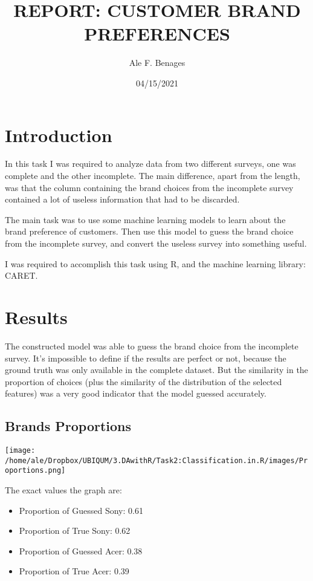 \documentclass[
]{article}
\title{REPORT: CUSTOMER BRAND PREFERENCES}
\author{Ale F. Benages}
\date{04/15/2021}
\providecommand{\tightlist}{%
  \setlength{\itemsep}{0pt}\setlength{\parskip}{0pt}}
\begin{document}
\maketitle

\hypertarget{introduction}{%
\section{Introduction}\label{introduction}}

In this task I was required to analyze data from two different surveys,
one was complete and the other incomplete. The main difference, apart
from the length, was that the column containing the brand choices from
the incomplete survey contained a lot of useless information that had to
be discarded.

The main task was to use some machine learning models to learn about the
brand preference of customers. Then use this model to guess the brand
choice from the incomplete survey, and convert the useless survey into
something useful.

I was required to accomplish this task using R, and the machine learning
library: CARET.

\hypertarget{results}{%
\section{Results}\label{results}}

The constructed model was able to guess the brand choice from the
incomplete survey. It's impossible to define if the results are perfect
or not, because the ground truth was only available in the complete
dataset. But the similarity in the proportion of choices (plus the
similarity of the distribution of the selected features) was a very good
indicator that the model guessed accurately.

\hypertarget{brands-proportions}{%
\subsection{Brands Proportions}\label{brands-proportions}}

\texttt{[image: /home/ale/Dropbox/UBIQUM/3.DAwithR/Task2:Classification.in.R/images/Proportions.png]}

The exact values the graph are:

\begin{itemize}
\tightlist
\item
  Proportion of Guessed Sony: 0.61\\
\item
  Proportion of True Sony: 0.62\\
\item
  Proportion of Guessed Acer: 0.38\\
\item
  Proportion of True Acer: 0.39
\end{itemize}
\end{document}
